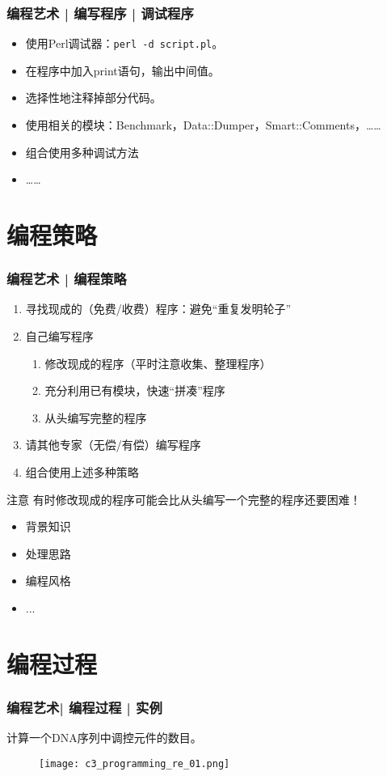 \begin{frame}[fragile]
  \frametitle{编程艺术 | 编写程序 | \alert{调试程序}}
  \begin{itemize}
    \item 使用Perl调试器：\verb|perl -d script.pl|。
    \item 在程序中加入print语句，输出中间值。
    \item 选择性地注释掉部分代码。
    \item 使用相关的模块：Benchmark，Data::Dumper，Smart::Comments，……
    \item 组合使用多种调试方法
    \item ……
  \end{itemize}
\end{frame}

\section{编程策略}
\begin{frame}
  \frametitle{编程艺术 | \alert{编程策略}}
  \begin{enumerate}
    \item 寻找现成的（免费/收费）程序：避免“重复发明轮子”
    \item 自己编写程序
      \begin{enumerate}
	\item 修改现成的程序（平时注意收集、整理程序）
	\item 充分利用已有模块，快速“拼凑”程序
	\item 从头编写完整的程序
      \end{enumerate}
    \item 请其他专家（无偿/有偿）编写程序
    \item 组合使用上述多种策略
  \end{enumerate}
  \pause
  \begin{block}{注意}
    有时修改现成的程序可能会比从头编写一个完整的程序还要困难！
    \begin{itemize}
      \item 背景知识
      \item 处理思路
      \item 编程风格
      \item ...
    \end{itemize}
  \end{block}
\end{frame}

\section{编程过程}
\begin{frame}
  \frametitle{编程艺术| 编程过程 | 实例}
  \begin{center}
    {\Large 计算一个DNA序列中调控元件的数目。}
  \end{center}
  \begin{figure}
    \centering
    \texttt{[image: c3\_programming\_re\_01.png]}
  \end{figure}
\end{frame}


